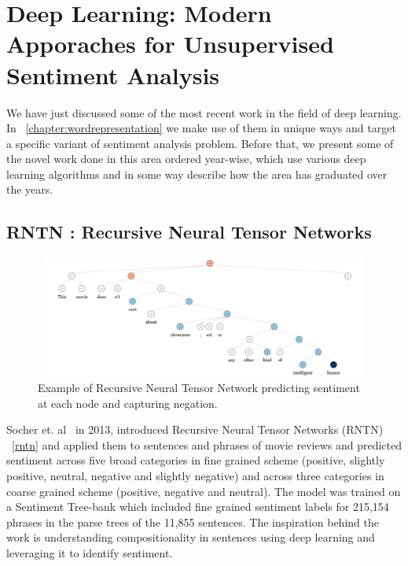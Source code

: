 \chapter{Deep Learning: Modern Apporaches for Unsupervised Sentiment Analysis}\label{chapter:modernapproach}
We have just discussed some of the most recent work in the field of deep learning. In ~\autoref{chapter:wordrepresentation} we make use of them in unique ways and target a specific variant of sentiment analysis problem. Before that, we present some of the novel work done in this area ordered year-wise, which use various deep learning algorithms and in some way describe how the area has graduated over the years. 
\section{RNTN : Recursive Neural Tensor Networks}

\begin{figure}[ht!]
	\centering
		\includegraphics[height=40mm,  width=140mm]{figures/5_rntn.png}
		\caption[Example of Recursive Neural Tensor Network]{Example of Recursive Neural Tensor Network predicting sentiment at each node and capturing negation.}
			\label{rntn}
\end{figure}

Socher et. al~\parencite{rntnsocher} in 2013, introduced Recursive Neural Tensor Networks (RNTN) ~\autoref{rntn} and applied them to sentences and phrases of movie reviews and predicted sentiment across five broad categories in fine grained scheme (positive, slightly positive, neutral, negative and slightly negative) and across three categories in coarse grained scheme (positive, negative and neutral). The model was trained on a Sentiment Tree-bank which included fine grained sentiment labels for 215,154 phrases in the parse trees of the 11,855 sentences.  The inspiration behind the work is understanding compositionality in sentences using deep learning and leveraging it to identify sentiment.
\newline

